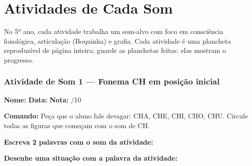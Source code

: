
\chapter{Atividades de Cada Som}

No 5º ano, cada atividade trabalha um som-alvo com foco em consciência fonológica, articulação (Boquinha) e grafia. Cada atividade é uma plancheta reproduzível de página inteira; guarde as planchetas feitas: elas mostram o progresso.



\subsection{Atividade de Som 1 --- Fonema CH em posição inicial}
\begin{exercicio}



\noindent\textbf{Nome:} \underline{\hspace{3.2cm}} \quad \textbf{Data:} \underline{\hspace{1.6cm}} \quad \textbf{Nota:} \underline{\hspace{0.9cm}}/10


\noindent\textbf{Comando:} Peça que o aluno fale devagar: CHA, CHE, CHI, CHO, CHU. Circule todas as figuras que começam com o som de CH.


\begin{center}
\end{center}

\noindent\textbf{Escreva 2 palavras com o som da atividade:}

\begin{center}
  \underline{\hspace{3cm}} \quad \underline{\hspace{3cm}}
\end{center}

\noindent\textbf{Desenhe uma situação com a palavra da atividade:}

\begin{center}
\end{center}

\end{exercicio}

